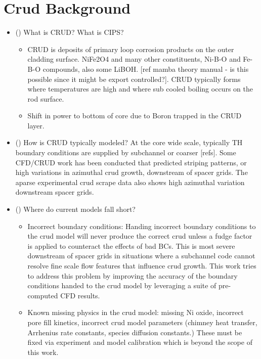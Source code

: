 
\section{Crud Background}

\begin{itemize}
        \item (\checkmark) What is CRUD?  What is CIPS?
                \begin{itemize}
                \item CRUD is deposits of primary loop corrosion products on the outer cladding surface.  NiFe2O4 and many other constituents, Ni-B-O and Fe-B-O compounds, also some LiBOH. [ref mamba theory manual - is this possible since it might be export controlled?].  CRUD  typically forms where temperatures are high and where sub cooled boiling occurs on the rod surface.
                \item Shift in power to bottom of core due to Boron trapped in the CRUD layer.
                \end{itemize}
        \item (\checkmark) How is CRUD typically modeled?  At the core wide scale, typically TH boundary conditions are supplied by subchannel or coarser [refs].  Some CFD/CRUD work has been conducted that predicted striping patterns, or high variations in azimuthal crud growth, downstream of spacer grids.  The aparse experimental crud scrape data also shows high azimuthal variation downstream spacer grids.
        \item (\checkmark) Where do current models fall short?
        \begin{itemize}
                \item Incorrect boundary conditions: Handing incorrect boundary conditions to the crud model will never produce the correct crud unless a fudge factor is applied to counteract the effects of bad BCs.  This is most severe downstream of spacer grids in situations where a subchannel code cannot resolve fine scale flow features that influence crud growth.  This work tries to address this problem by improving the accuracy of the boundary conditions handed to the crud model by leveraging a suite of pre-computed CFD results.
                \item Known missing physics in the crud model: missing Ni oxide, incorrect pore fill kinetics, incorrect crud model parameters (chimney heat transfer, Arrhenius rate constants, species diffusion constants.) These must be fixed via experiment and model calibration which is beyond the scope of this work.
        \end{itemize}
\end{itemize}

